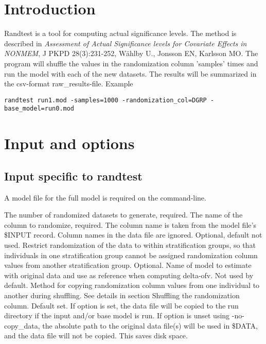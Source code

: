 


\maketitle


\section{Introduction}

Randtest is a tool for computing actual significance levels. The method is described in
\emph{Assessment of Actual Significance levels for Covariate Effects in NONMEM}, 
J PKPD 28(3):231-252, Wählby U., Jonsson EN, Karlsson MO. 
The program will shuffle the values in the randomization 
column 'samples' times and run the model with each of the new datasets. The results will be summarized in the csv-format raw\_results-file. 
Example
\begin{verbatim}
randtest run1.mod -samples=1000 -randomization_col=DGRP -base_model=run0.mod
\end{verbatim}

\section{Input and options}
\subsection{Input specific to randtest}
A model file for the full model is required on the command-line.
\begin{optionlist}
The number of randomized datasets to generate, required. 
\nextopt
{}
The name of the column to randomize, required. The column name is taken from the model file's \$INPUT record. Column names in the data file are ignored. 
\nextopt
{}
Optional, default not used. Restrict randomization of the data to within stratification groups, so that individuals in one stratification group cannot be assigned randomization column values from another stratification group. 
\nextopt
{}
Optional. Name of model to estimate with original data and use as reference when computing delta-ofv. 
\nextopt
{}
Not used by default. Method for copying randomization column values from one individual to another during shuffling. See details in section Shuffling the randomization column.     
\nextopt
{}
Default set. If option is set, the data file
will be copied to the run directory if the input and/or base model is run.
If option is unset using -no-copy\_data, the absolute path to the original data file(s) will be used in
\$DATA, and the data file will not be copied. This saves disk space.
\nextopt
\end{optionlist}

